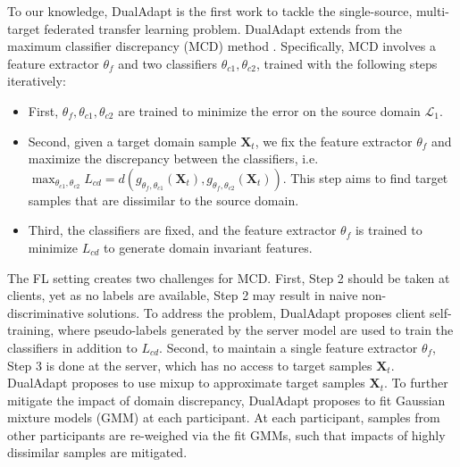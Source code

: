 \documentclass[11pt]{article}
\begin{document}
To our knowledge, DualAdapt \cite{yao2022federated} is the first work to tackle the single-source, multi-target federated transfer learning problem. DualAdapt extends from the maximum classifier discrepancy (MCD) method \cite{saito2018maximum}. Specifically, MCD involves a feature extractor $\theta_f$ and two classifiers $\theta_{c1}, \theta_{c2}$, trained with the following steps iteratively: 
\begin{itemize}
    \item First, $\theta_f, \theta_{c1}, \theta_{c2}$ are trained to minimize the error on the source domain $\mathcal{L}_1$. 
    \item Second, given a target domain sample $\mathbf{X}_t$, we fix the feature extractor $\theta_f$ and maximize the discrepancy between the classifiers, i.e. $\max_{\theta_{c1}, \theta_{c2}}L_{cd} = d(g_{\theta_f, \theta_{c1}}(\mathbf{X}_t), g_{\theta_f, \theta_{c2}}(\mathbf{X}_t))$. This step aims to find target samples that are dissimilar to the source domain. 
    \item Third, the classifiers are fixed, and the feature extractor $\theta_f$ is trained to minimize $L_{cd}$ to generate domain invariant features. 
\end{itemize}
The FL setting creates two challenges for MCD. First, Step 2 should be taken at clients, yet as no labels are available, Step 2 may result in naive non-discriminative solutions. To address the problem, DualAdapt proposes client self-training, where pseudo-labels generated by the server model are used to train the classifiers in addition to $L_{cd}$. Second, to maintain a single feature extractor $\theta_f$, Step 3 is done at the server, which has no access to target samples $\mathbf{X}_t$. DualAdapt proposes to use mixup \cite{zhang2017mixup} to approximate target samples $\mathbf{X}_t$. To further mitigate the impact of domain discrepancy, DualAdapt proposes to fit Gaussian mixture models (GMM) at each participant. At each participant, samples from other participants are re-weighed via the fit GMMs, such that impacts of highly dissimilar samples are mitigated.
\end{document}
